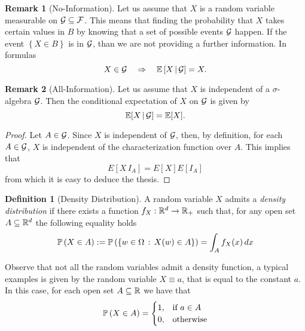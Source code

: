 \documentclass{report}
\theoremstyle{definition}
\newtheorem{defn}{Definition}
\newtheorem{oss}{Remark}
\begin{document}
\begin{oss}[No-Information]
  Let us assume that $X$ is a random variable measurable on $\mathcal{G}\subseteq \mathcal{F}$.
  This means that finding the probability that $X$ takes certain values in
  $B$  by knowing that a set of possible events $\mathcal{G}$ happen. If the event
  $\left\{ X\in B\right\}$ is in $\mathcal{G}$, than we are not providing a further
  information. In formulas
  \begin{equation}
    X\in\mathcal{G}\quad \Rightarrow\quad \mathbb{E}\left[ X\,\vert\,\mathcal{G} \right] = X.
  \end{equation}
\end{oss}


\begin{oss}[All-Information]
  Let us assume that $X$ is independent of a $\sigma$-algebra $\mathcal{G}$. Then the
  conditional expectation of $X$ on $\mathcal{G}$ is given by
  \begin{equation}
    \mathbb{E}[X\,\vert\,\mathcal{G}]=\mathbb{E}[X].
  \end{equation}
  \begin{proof}
    Let $A\in\mathcal{G}$. Since $X$ is independent of $\mathcal{G}$, then, by definition,
    for each $A\in\mathcal{G}$, $X$ is independent of the characterization function
    over $A$. This implies that
    \begin{equation}
      E\left[ X\,I_A \right] =E\left[ X \right]E\left[ I_A \right]
    \end{equation}
    from which it is easy to deduce the thesis.
  \end{proof}
\end{oss}
\begin{defn}[Density Distribution]
  A random variable $X$ admits a \textit{density distribution} if there
  exists a function $f_X:\mathbb{R}^d\to\mathbb{R}_+$ such that, for any open set
  $A\subseteq\mathbb{R}^d$ the
  following equality holds
  \begin{equation}
    \mathbb{P}\left( X\in A \right) := \mathbb{P}\left( \left\{ w\in\Omega\,:\,X(w)\in A \right\} \right)= \int_A f_X(x)\,dx
    \label{eq:density}
  \end{equation}
\end{defn}
Observe that not all the random variables admit a density function, a
typical examples is given by the random variable $X\equiv a$, that is equal to the
constant $a$. In this case, for each open set $A\subseteq \mathbb{R}$ we have that
\begin{equation}
  \mathbb{P}\left( X\in A \right)=
  \begin{cases}
    1, &\mbox{if } a\in A\\
    0, &\mbox{otherwise}
  \end{cases}
  \label{eq:not_f}
\end{equation}
\end{document}

